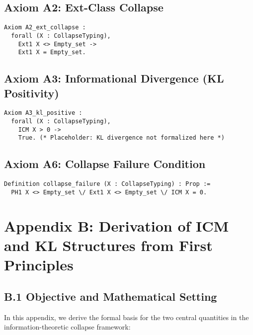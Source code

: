 \documentclass[11pt]{article}
\begin{document}
\subsection*{Axiom A2: Ext-Class Collapse}

\begin{lstlisting}
Axiom A2_ext_collapse :
  forall (X : CollapseTyping),
    Ext1 X <> Empty_set ->
    Ext1 X = Empty_set.
\end{lstlisting}

\subsection*{Axiom A3: Informational Divergence (KL Positivity)}

\begin{lstlisting}
Axiom A3_kl_positive :
  forall (X : CollapseTyping),
    ICM X > 0 ->
    True. (* Placeholder: KL divergence not formalized here *)
\end{lstlisting}

\subsection*{Axiom A6: Collapse Failure Condition}

\begin{lstlisting}
Definition collapse_failure (X : CollapseTyping) : Prop :=
  PH1 X <> Empty_set \/ Ext1 X <> Empty_set \/ ICM X = 0.
\end{lstlisting}



\section*{Appendix B: Derivation of ICM and KL Structures from First Principles}

\subsection*{B.1 Objective and Mathematical Setting}

In this appendix, we derive the formal basis for the two central quantities in the information-theoretic collapse framework:
\end{document}
